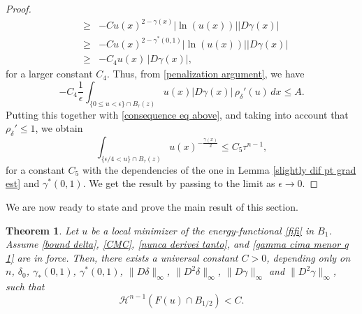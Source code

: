 \documentclass[reqno,11pt]{amsart}
\newtheorem{theorem}{Theorem}[section]
\newcommand{\1}{\mathds{1}}
\numberwithin{equation}{section}
\begin{document}
\begin{proof}
\begin{eqnarray*}
         & \geq & -Cu(x)^{2 - \gamma(x)} |\ln(u(x))| |D\gamma(x)|\\
         & \geq & -Cu(x)^{2 - \gamma^\ast(0,1)} |\ln(u(x))| |D\gamma(x)|\\
         & \geq & -C_4u(x)\, |D\gamma(x)|,
\end{eqnarray*}
for a larger constant $C_4$. Thus, from \eqref{penalization argument}, we have
$$
    -C_4 \frac{1}{\epsilon}\int_{\{0 \leq u < \epsilon \} \cap B_\tau(z)} u(x) |D\gamma(x)| \, \rho_\delta'(u)\,dx \leq A.
$$
Putting this together with \eqref{consequence eq above}, and taking into account that $\rho_\delta ' \leq 1$, we obtain
$$
   \int_{\{ \epsilon/4 < u \}\cap B_\tau(z)} u(x)^{-\frac{\gamma(x)}{2}} \leq C_5 \tau^{n-1}, 
$$
for a constant $C_5$ with the dependencies of the one in Lemma \ref{slightly dif pt grad est} and $\gamma^\ast(0,1)$. We get the result by passing to the limit as $\epsilon \rightarrow 0$.
\end{proof}

We are now ready to state and prove the main result of this section.

\begin{theorem}
Let $u$ be a local minimizer of the energy-functional \eqref{fifi} in $B_1$. Assume \eqref{bound delta}, \eqref{CMC}, \eqref{nunca derivei tanto}, and \eqref{gamma cima menor q 1} are in force. Then, there exists a universal constant $C>0$,
depending only on $n$, $\delta_0$, $\gamma_\ast (0,1)$, $\gamma^\ast (0,1)$, $\|D\delta\|_\infty$, $\|D^2 \delta\|_{\infty}$, $\|D\gamma\|_\infty$ and $\|D^2 \gamma\|_{\infty}$, such that
$$
\mathcal{H}^{n-1}(F(u) \cap B_{1/2}) < C.
$$
\end{theorem}
\end{document}
